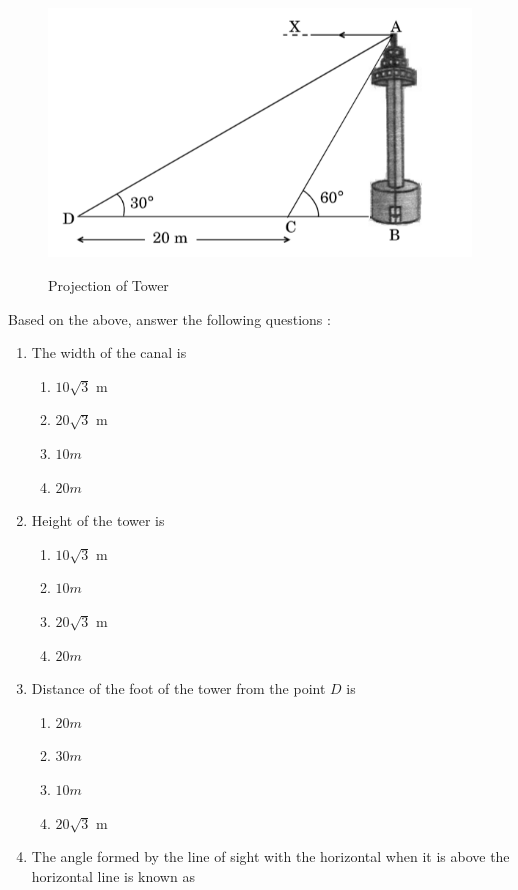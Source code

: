 \documentclass[11pt]{article}
\begin{document}
\begin{enumerate}
		\begin{figure}[ht!]
			\includegraphics[width=\columnwidth]{Figs/Problem.png}
			\label{fig:traingle}
			\caption{Projection of Tower}
		\end{figure}
		Based on the above, answer the following questions :
		\begin{enumerate}[label=(\roman*)]
			\item The width of the canal is
				\begin{enumerate}[label=(\Alph*)]
					\item ${10}\sqrt{3}$ m
					\item ${20}\sqrt{3}$ m
					\item $10 m$
					\item $20 m$
				\end{enumerate}
			\item Height of the tower is
				\begin{enumerate}[label=(\Alph*)]
					\item ${10}\sqrt{3}$ m
					\item $10 m$
					\item ${20}\sqrt{3}$ m
					\item $20 m$
				\end{enumerate}
			\item Distance of the foot of the tower from the point $D$ is
				\begin{enumerate}[label=(\Alph*)]
					\item $20 m$
					\item $30 m$
					\item $10 m$
					\item ${20}\sqrt{3}$ m
				\end{enumerate}
			\item The angle formed by the line of sight with the horizontal when it is above the horizontal line is known as

\end{enumerate}
\end{enumerate}
\end{document}
